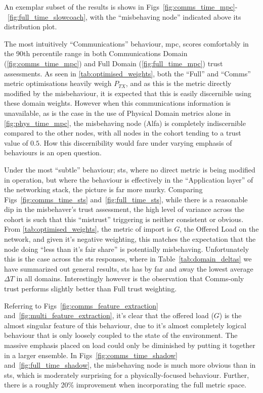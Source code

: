 An exemplar subset of the results is shows in Figs~\ref{fig:comms_time_mpc}-~\ref{fig:full_time_slowcoach}, with the ``misbehaving node'' indicated above its distribution plot.

The most intuitively ``Communications'' behaviour, \gls{mpc}, scores comfortably in the 90th percentile range in both Communications Domain (\autoref{fig:comms_time_mpc}) and Full Domain (\autoref{fig:full_time_mpc})  trust assessments. As seen in \autoref{tab:optimised_weights}, both the ``Full'' and ``Comms'' metric optimisations heavily weigh $P_{TX}$, and as this is the metric directly modified by the misbehaviour, it is expected that this is easily discernible using these domain weights.
However when this communications information is unavailable, as is the case in the use of Physical Domain metrics alone in \autoref{fig:phys_time_mpc}, the misbehaving node (Alfa) is completely indiscernible compared to the other nodes, with all nodes in the cohort tending to a trust value of $0.5$.
How this discernibility would fare under varying emphasis of behaviours is an open question.

Under the most ``subtle'' behaviour; \gls{sts}, where no direct metric is being modified in operation, but where the behaviour is effectively in the ``Application layer'' of the networking stack, the picture is far more murky. 
Comparing Figs~\ref{fig:comms_time_sts} and~\ref{fig:full_time_sts}, while there is a reasonable dip in the misbehaver’s trust assessment, the high level of variance across the cohort is such that this ``mistrust'' triggering is neither consistent or obvious. 
From \autoref{tab:optimised_weights}, the metric of import is $G$, the Offered Load on the network, and given it's negative weighting, this matches the expectation that the node doing ``less than it's fair share'' is potentially misbehaving. 
Unfortunately this is the case across the \gls{sts} responses, where in Table~\ref{tab:domain_deltas} we have summarized out general results, \gls{sts} has by far and away the lowest average $\Delta T$ in all domains. 
Interestingly however is the observation that Comms-only trust performs slightly better than Full trust weighting.

Referring to Figs~\ref{fig:comms_feature_extraction} and~\autoref{fig:multi_feature_extraction}, it's clear that the offered load ($G$) is the almost singular feature of this behaviour, due to it's almost completely logical behaviour that is only loosely coupled to the state of the environment. 
The massive emphasis placed on load could only be diminished by putting it together in a larger ensemble.
In Figs~\ref{fig:comms_time_shadow} and~\ref{fig:full_time_shadow}, the misbehaving node is much more obvious than in \gls{sts}, which is moderately surprising for a physically-focused behaviour. Further, there is a roughly 20\% improvement when incorporating the full metric space.

